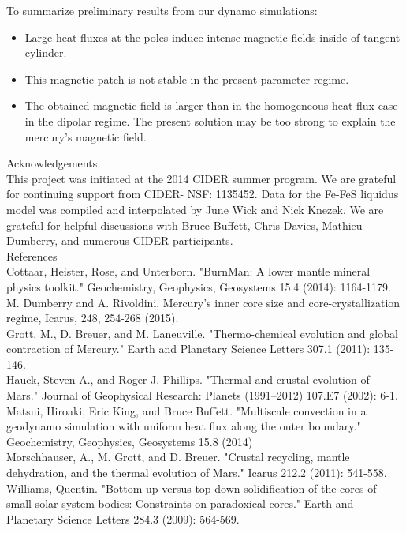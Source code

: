 \documentclass[landscape,a0b,final]{a0poster}
\begin{document}
\begin{multicols}{3}
To summarize preliminary results from our dynamo simulations:
\begin{itemize}
\item Large heat fluxes at the poles induce intense magnetic fields inside of tangent cylinder.
\item This magnetic patch is not stable in the present parameter regime.
\item The obtained magnetic field is larger than in the homogeneous heat flux case in the dipolar regime. The present solution may be too strong to explain the mercury's magnetic field.
\end{itemize}

{ \large Acknowledgements \\ \small
This project was initiated at the 2014 CIDER summer program.  We are grateful for continuing support from CIDER- NSF: 1135452.
Data for the Fe-FeS liquidus model was compiled and interpolated by June Wick and Nick Knezek.
We are grateful for helpful discussions with Bruce Buffett, Chris Davies, Mathieu Dumberry, and numerous CIDER participants.
}
\\
{ \large References \\ \tiny
Cottaar, Heister, Rose, and Unterborn. "BurnMan: A lower mantle mineral physics toolkit." Geochemistry, Geophysics, Geosystems 15.4 (2014): 1164-1179. \\
M. Dumberry and A. Rivoldini, Mercury’s inner core size and core-crystallization regime, Icarus, 248, 254-268 (2015). \\
Grott, M., D. Breuer, and M. Laneuville. "Thermo-chemical evolution and global contraction of Mercury." Earth and Planetary Science Letters 307.1 (2011): 135-146. \\
Hauck, Steven A., and Roger J. Phillips. "Thermal and crustal evolution of Mars." Journal of Geophysical Research: Planets (1991–2012) 107.E7 (2002): 6-1. \\
Matsui, Hiroaki, Eric King, and Bruce Buffett. "Multiscale convection in a geodynamo simulation with uniform heat flux along the outer boundary." Geochemistry, Geophysics, Geosystems 15.8 (2014) \\
Morschhauser, A., M. Grott, and D. Breuer. "Crustal recycling, mantle dehydration, and the thermal evolution of Mars." Icarus 212.2 (2011): 541-558. \\
Williams, Quentin. "Bottom-up versus top-down solidification of the cores of small solar system bodies: Constraints on paradoxical cores." Earth and Planetary Science Letters 284.3 (2009): 564-569.
 }

\end{multicols}
\end{document}
